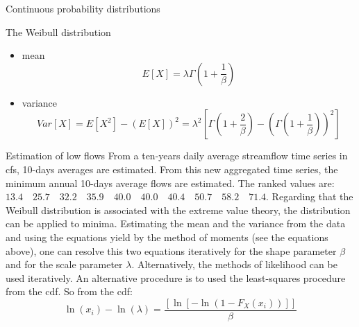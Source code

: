 \documentclass[8pt]{beamer}
\renewcommand{\emph}[1]{\textcolor{myorange}{#1}}
\begin{document}
\begin{frame}{Continuous probability distributions} 
    \begin{block}{The \alert{Weibull} distribution}
        \begin{itemize}
            \item \emph{mean}
                \[
                    E[X] = \lambda \Gamma \left( 1 + \frac{1}{\beta} \right)
                \]
            \item \emph{variance}
                \[
                    Var[X] = E[X^2] - \left( E[X] \right)^2 = \lambda^2 \left[ \Gamma \left(1 + \frac{2}{\beta} \right) - \left( \Gamma \left( 1 + \frac{1}{\beta} \right) \right)^2 \right]
                \]
        \end{itemize}
\end{block}
 \begin{exampleblock}{Estimation of low flows} %
     From a ten-years daily average streamflow time series  in \emph{cfs}, 10-days averages are estimated. From this new aggregated time series, the minimum annual 10-days average flows are estimated. The ranked values are: $13.4 \quad 25.7 \quad 32.2 \quad 35.9 \quad 40.0 \quad 40.0 \quad 40.4 \quad 50.7 \quad 58.2 \quad 71.4$. Regarding that  the \emph{Weibull distribution} is associated with the \emph{extreme value theory}, the distribution can be applied to minima. Estimating the \emph{mean} and the \emph{variance} from the data and using the equations yield by the method of moments (see the equations above), one can resolve this two equations iteratively for the shape parameter $\beta$ and for the scale parameter $\lambda$. Alternatively, the \emph{methods of likelihood} can be used iteratively. An alternative procedure is to used the \emph{least-squares procedure} from the \emph{cdf}. So from the \emph{cdf}:
     \[
         \ln (x_i) - \ln (\lambda) = \frac{\left[\ln \left[-\ln \left(1 - F_X (x_i) \right) \right]\right]}{\beta}
     \]
    \end{exampleblock}
\end{frame}
\end{document}
